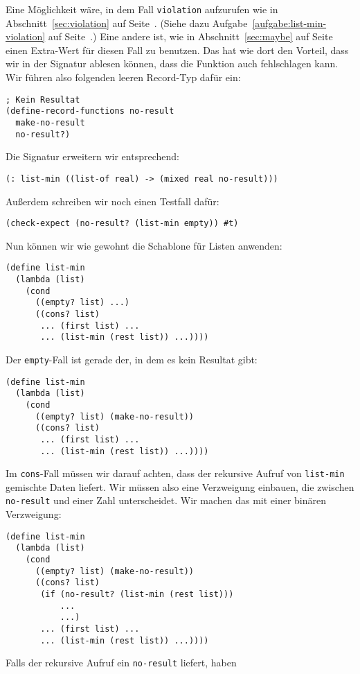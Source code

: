 Eine Möglichkeit wäre, in dem Fall \lstinline{violation} aufzurufen
wie in Abschnitt~\ref{sec:violation} auf
Seite~\pageref{sec:violation}.  (Siehe dazu
Aufgabe~\ref{aufgabe:list-min-violation} auf
Seite~\pageref{aufgabe:list-min-violation}.)  Eine andere ist, wie in
Abschnitt~\ref{sec:maybe} auf Seite~\pageref{sec:maybe} einen
Extra-Wert für diesen Fall zu benutzen.  Das hat wie dort den Vorteil,
dass wir in der Signatur ablesen können, dass die Funktion auch
fehlschlagen kann.  Wir führen also folgenden leeren Record-Typ dafür
ein:
%
\begin{lstlisting}
; Kein Resultat
(define-record-functions no-result
  make-no-result
  no-result?)
\end{lstlisting}
%
Die Signatur erweitern wir entsprechend:
%
\begin{lstlisting}
(: list-min ((list-of real) -> (mixed real no-result)))
\end{lstlisting}
%
Außerdem schreiben wir noch einen Testfall dafür:
%
\begin{lstlisting}
(check-expect (no-result? (list-min empty)) #t)
\end{lstlisting}
%
Nun können wir wie gewohnt die Schablone für Listen anwenden:
%
\begin{lstlisting}
(define list-min
  (lambda (list)
    (cond
      ((empty? list) ...)
      ((cons? list)
       ... (first list) ...
       ... (list-min (rest list)) ...))))
\end{lstlisting}
%
Der \lstinline{empty}-Fall ist gerade der, in dem es kein Resultat
gibt:
%
\begin{lstlisting}
(define list-min
  (lambda (list)
    (cond
      ((empty? list) (make-no-result))
      ((cons? list)
       ... (first list) ...
       ... (list-min (rest list)) ...))))
\end{lstlisting}
%
Im \lstinline{cons}-Fall müssen wir darauf achten, dass der rekursive
Aufruf von \lstinline{list-min} gemischte Daten liefert.  Wir müssen
also eine Verzweigung einbauen, die zwischen \lstinline{no-result} und
einer Zahl unterscheidet.  Wir machen das mit einer binären Verzweigung:
%
\begin{lstlisting}
(define list-min
  (lambda (list)
    (cond
      ((empty? list) (make-no-result))
      ((cons? list)
       (if (no-result? (list-min (rest list)))
           ...
           ...)
       ... (first list) ...
       ... (list-min (rest list)) ...))))
\end{lstlisting}
%
Falls der rekursive Aufruf ein \lstinline{no-result} liefert, haben
